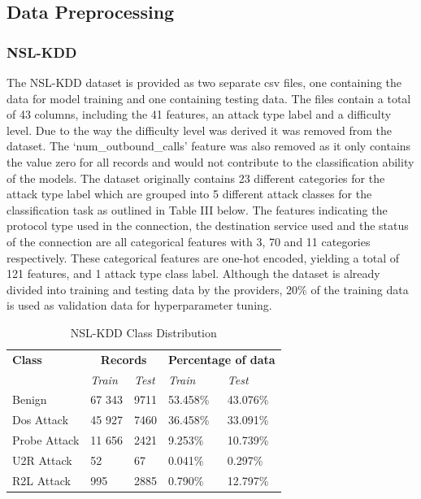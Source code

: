 \documentclass[conference]{IEEEtran}
\begin{document}
\subsection{Data Preprocessing}
\subsubsection{NSL-KDD}
\noindeny The NSL-KDD dataset is provided as two separate csv files, one containing the data for model training and one containing testing data. The files contain a total of 43 columns, including the 41 features, an attack type label and a difficulty level. Due to the way the difficulty level was derived it was removed from the dataset. The ‘num\_outbound\_calls’ feature was also removed as it only contains the value zero for all records and would not contribute to the classification ability of the models. The dataset originally contains 23 different categories for the attack type label which are grouped into 5 different attack classes for the classification task as outlined in Table III below.
The features indicating the protocol type used in the connection, the destination service used and the status of the connection are all categorical features with 3, 70 and 11 categories respectively. These categorical features are one-hot encoded, yielding a total of 121 features, and 1 attack type class label.
Although the dataset is already divided into training and testing data by the providers, 20\% of the training data is used as validation data for hyperparameter tuning. 


\begin{table}[htbp]
\caption{NSL-KDD Class Distribution}
\begin{center}
\begin{tabular}{|p{1.75cm}|p{1cm}|p{1cm}|p{1cm}|p{1cm}|}
\hline
\textbf{Class} &
\multicolumn{2}{|c|}{\textbf{Records}} &
\multicolumn{2}{|c|}{\textbf{Percentage of data}}
\\
\cline{2-5}
 & \textit{Train}& \textit{Test}&\textit{Train}& \textit{Test}\\[2pt]
\hline
Benign & 67 343 & 9711 & 53.458\% & 43.076\% \\[5pt]
\hline
Dos Attack & 45 927 & 7460 & 36.458\% & 33.091\% \\[5pt]
\hline
Probe Attack & 11 656 & 2421 & 9.253\% & 10.739\% \\[5pt]
\hline
U2R Attack & 52 & 67 & 0.041\% & 0.297\% \\[5pt]
\hline
R2L Attack & 995 & 2885 & 0.790\% & 12.797\% \\[5pt]
\hline
\end{tabular}
\label{tab1}
\end{center}
\end{table}
\end{document}
